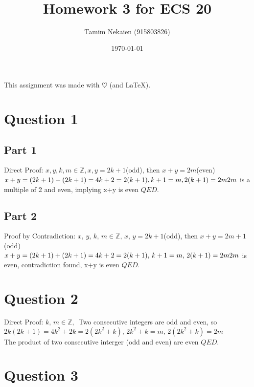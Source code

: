\documentclass[a4paper,12pt]{article}
\begin{document}
\title{Homework 3 for ECS 20}
\author{Tamim Nekaien (915803826)}
\date{\today}
\maketitle

This assignment was made with 
$\heartsuit$ (and \LaTeX).

\tableofcontents
\newpage
 
\section{Question 1}
\label{sec1}

\subsection{Part 1}
\label{sec2}

Direct Proof: $x,y,k,m \in \mathbb{Z}, x,y = 2k+1$(odd), then $x+y = 2m$(even) \\
$x + y = (2k+1)+(2k+1) = 4k+2 = 2(k+1), k+1 = m, 2(k+1) = 2m \\
2m$ is a multiple of 2 and even, implying x+y is even $QED$.

\subsection{Part 2}
\label{sec3}

Proof by Contradiction: $x,\,y,\,k,\,m \in \mathbb{Z},\, x,\,y = 2k+1$(odd), then $x+y = 2m+1$(odd) \\ 
$x+y = (2k+1)+(2k+1) = 4k+2 = 2(k+1),\,k+1 = m,\, 2(k+1) = 2m \\
2m$ is even, contradiction found, x+y is even $QED$.

\section{Question 2}
\label{sec4}

Direct Proof: $k,\,m \in \mathbb{Z},\, $ Two consecutive integers are odd and even, so $2k(2k+1)= 4k^2 + 2k = 2(2k^2+k),\, 2k^2+k = m,\, 2(2k^2+k) = 2m$ \\
The product of two consecutive interger (odd and even) are even $QED$.

\section{Question 3}
\label{sec5}
\end{document}
